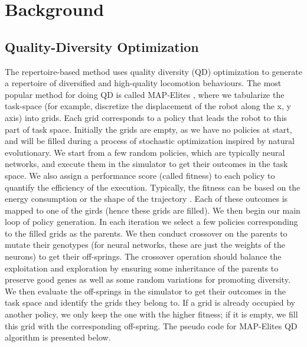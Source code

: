 
\section{Background}
\subsection{Quality-Diversity Optimization}
The repertoire-based method uses quality diversity (QD) optimization to generate a repertoire of diversified and high-quality locomotion behaviours. 
The most popular method for doing QD is called MAP-Elites \cite{QD, Map-Elites}, where we tabularize the task-space (for example, discretize the displacement of the robot along the x, y axis) into grids. 
Each grid corresponds to a policy that leads the robot to this part of task space. 
Initially the grids are empty, as we have no policies at start, and will be filled during a process of stochastic optimization inspired by natural evolutionary. 
We start from a few random policies, which are typically neural networks, and execute them in the simulator to get their outcomes in the task space. 
We also assign a performance score (called fitness) to each policy to quantify the efficiency of the execution. Typically, the fitness can be based on the energy consumption \cite{Q-Dax} or the shape of the trajectory \cite{evorbc_conf}.
Each of these outcomes is mapped to one of the girds (hence these grids are filled). 
We then begin our main loop of policy generation. 
In each iteration we select a few policies corresponding to the filled grids as the parents. We then conduct crossover on the parents to mutate their genotypes (for neural networks, these are just the weights of the neurons) to get their off-springs. 
The crossover operation should balance the exploitation and exploration by ensuring some inheritance of the parents to preserve good genes as well as some random variations for promoting diversity.
We then evaluate the off-springs in the simulator to get their outcomes in the task space and identify the grids they belong to.
If a grid is already occupied by another policy, we only keep the one with the higher fitness; if it is empty, we fill this grid with the corresponding off-spring. 
The pseudo code for MAP-Elites QD algorithm is presented below.

